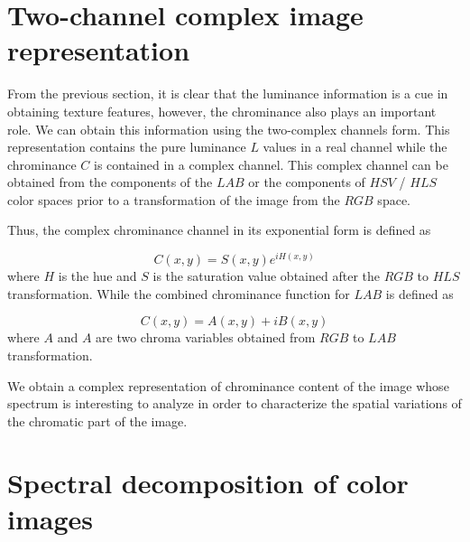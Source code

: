 \section{Two-channel complex image representation}

From the previous section, it is clear that the luminance information is a cue in obtaining texture features, however, the chrominance also plays an important role. We can obtain this information using the two-complex channels form. This representation contains the pure luminance $L$ values in a real channel while the chrominance $C$ is contained in a complex channel. This complex channel can be obtained from the components of the $LAB$ or the components of $HSV$ / $HLS$ color spaces prior to a transformation of the image from the $RGB$ space.

Thus, the complex chrominance channel in its exponential form is defined as  

\begin{equation}\label{eq:chrominance_hsv}
    C(x,y) = S(x,y) e^{iH(x,y)}
\end{equation}
where $H$ is the hue and $S$ is the saturation value obtained after the $RGB$ to $HLS$ transformation. While the combined chrominance function for $LAB$ is defined as

\begin{equation}\label{eq:chrominance_lab}
    C(x,y) = A(x,y) + iB(x,y)
\end{equation}
where $A$ and $A$ are two chroma variables obtained from $RGB$ to $LAB$ transformation. 

We obtain a complex representation of chrominance content of the image whose spectrum is interesting to analyze in order to characterize the spatial variations of the chromatic part of the image. 

\section{Spectral decomposition of color images}

